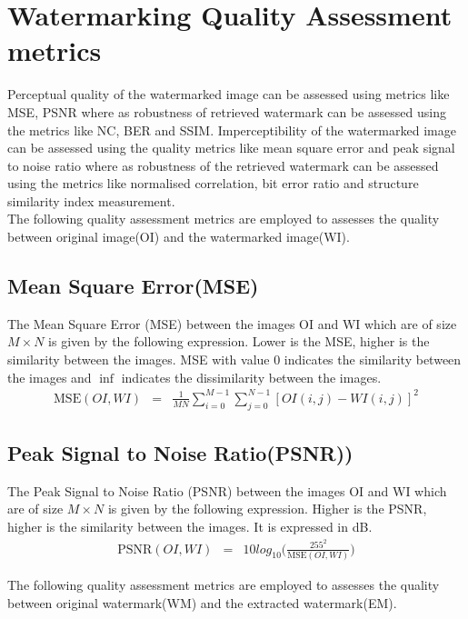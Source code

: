 \chapter{Watermarking Quality Assessment metrics}\label{WMQAP}
Perceptual quality of the watermarked image can be assessed using metrics like MSE, PSNR where as robustness of retrieved watermark can be assessed using the metrics like NC, BER and SSIM.
Imperceptibility of the watermarked image can be assessed using the quality metrics like mean square error and peak signal to noise ratio where as robustness of the retrieved watermark can be assessed using the metrics like normalised correlation, bit error ratio and structure similarity index measurement.\\

The following quality assessment metrics are employed to assesses the quality between original image(OI) and the watermarked image(WI).
\section{Mean Square Error(MSE)}
The Mean Square Error (MSE) between the images OI and WI which are of size  $M \times N$ is given by the following expression. Lower is the MSE, higher is the similarity between the images. MSE with value $0$ indicates the similarity between the images and $\inf $ indicates the dissimilarity  between the images.
\begin{eqnarray}
\nonumber
\text{MSE}(OI,WI)&=&\frac{1}{MN}\sum_{i=0}^{M-1}\sum_{j=0}^{N-1}[OI(i,j)-WI(i,j)]^2
\nonumber
\end{eqnarray}
\section{Peak Signal to Noise Ratio(PSNR))}
The Peak Signal to Noise Ratio (PSNR) between the images OI and WI which are of size  $M \times N$ is given by the following expression. Higher is the PSNR, higher is the similarity between the images. It is expressed in dB.
\begin{eqnarray}
\nonumber
\text{PSNR}(OI,WI)&=& 10log_{10}\bigl(\frac{255^2}{\text{MSE}(OI,WI)}\bigl)
\nonumber
\end{eqnarray}


The following quality assessment metrics are employed to assesses the quality between original watermark(WM) and the extracted watermark(EM).
